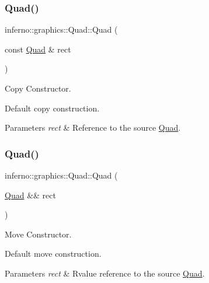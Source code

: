\subsubsection{\texorpdfstring{Quad()}{Quad()}\hspace{0.1cm}{\footnotesize\ttfamily [5/6]}}
{\footnotesize\ttfamily inferno\+::graphics\+::\+Quad\+::\+Quad (\begin{DoxyParamCaption}\item[{const \mbox{\hyperlink{classinferno_1_1graphics_1_1_quad}{Quad}} \&}]{rect }\end{DoxyParamCaption})\hspace{0.3cm}{\ttfamily [default]}}



Copy Constructor. 

Default copy construction. 
\begin{DoxyParams}{Parameters}
{\em rect} & Reference to the source \mbox{\hyperlink{classinferno_1_1graphics_1_1_quad}{Quad}}. \\
\hline
\end{DoxyParams}
\mbox{\label{classinferno_1_1graphics_1_1_quad_a6c4c6693883f26437908876e72aba247}} 
\subsubsection{\texorpdfstring{Quad()}{Quad()}\hspace{0.1cm}{\footnotesize\ttfamily [6/6]}}
{\footnotesize\ttfamily inferno\+::graphics\+::\+Quad\+::\+Quad (\begin{DoxyParamCaption}\item[{\mbox{\hyperlink{classinferno_1_1graphics_1_1_quad}{Quad}} \&\&}]{rect }\end{DoxyParamCaption})\hspace{0.3cm}{\ttfamily [default]}}



Move Constructor. 

Default move construction. 
\begin{DoxyParams}{Parameters}
{\em rect} & Rvalue reference to the source \mbox{\hyperlink{classinferno_1_1graphics_1_1_quad}{Quad}}. \\
\hline
\end{DoxyParams}


